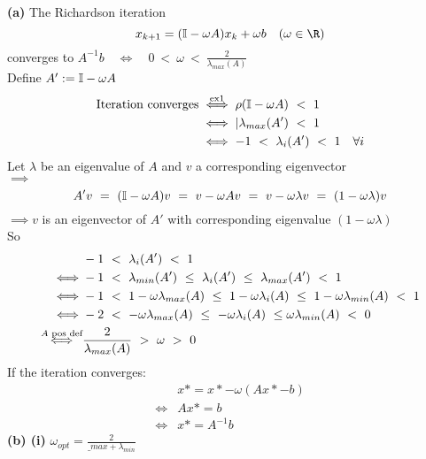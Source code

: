 \begin{SolutionSheet}[\ref{sheet6}]
\begin{onehalfspace}
  \begin{Solution}
    \textbf{(a)} \Claim The Richardson iteration \begin{equation*}
      x_{k+1} = (\I -\omega A)x_k + \omega b \quad (\omega \in \R)
    \end{equation*} converges to $A^{-1}b \quad \iff \quad 0 \ < \ \omega \ < \ \frac{2}{\lambda_{max}(A)}$ \\
    \Proof Define $A' := \mathbb{I} - \omega A$ \\
    \begin{align*}
      \text{Iteration converges} &\stackrel{\text{ex} 1}{\iff} \rho(\mathbb{I} -\omega A) \ < \ 1 \\
      &\iff |\lambda_{max}(A') \ < \ 1 \\
    &\iff -1 \ < \ \lambda_i(A') \ < \ 1 \quad \forall i
    \end{align*}
    Let $\lambda $ be an eigenvalue of $A$ and $v$ a corresponding eigenvector \\
    $\implies$ \begin{equation*}
      A' v \ = \ (\mathbb{I} - \omega A)v \ = \ v - \omega Av \ = \ v - \omega\lambda v \ = \ (1- \omega\lambda)v
    \end{equation*}
    $\implies v$ is an eigenvector of $A'$ with corresponding eigenvalue $(1-\omega\lambda)$\\
    So \begin{align*}
      & -1 \ <  \ \lambda_i(A') \ < \ 1 \\
      \iff & -1 \ < \ \lambda_{min}(A') \ \leq \ \lambda_i(A')  \ \leq \ \lambda_{max}(A') \ < \ 1 \\
      \iff & -1 \ < \ 1-\omega\lambda_{max}(A) \ \leq \ 1-\omega\lambda_{i}(A) \ \leq \ 1-\omega\lambda_{min}(A) \ < \ 1 \\
      \iff & -2 \ < \ - \omega\lambda_{max}(A) \ \leq \ - \omega\lambda_{i}(A) \ \leq \- \omega\lambda_{min}(A) \ < \ 0 \\
      \stackrel{A \text{ pos def}}{\iff} & \frac{2}{\lambda_{max}(A)} \ > \ \omega \ > \ 0
    \end{align*}
    If the iteration converges: \begin{align*}
      & x* = x* - \omega(Ax*-b) \\
      \iff & Ax* = b \\
      \iff & x* = A^{-1}b
    \end{align*}
    \textbf{(b) (i)} \Claim $\omega_{opt} = \frac{2}{\_{max}+\lambda_{min}}$ \\
    \Proof \begin{align*}

\end{align*}
\end{Solution}
\end{onehalfspace}
\end{SolutionSheet}
